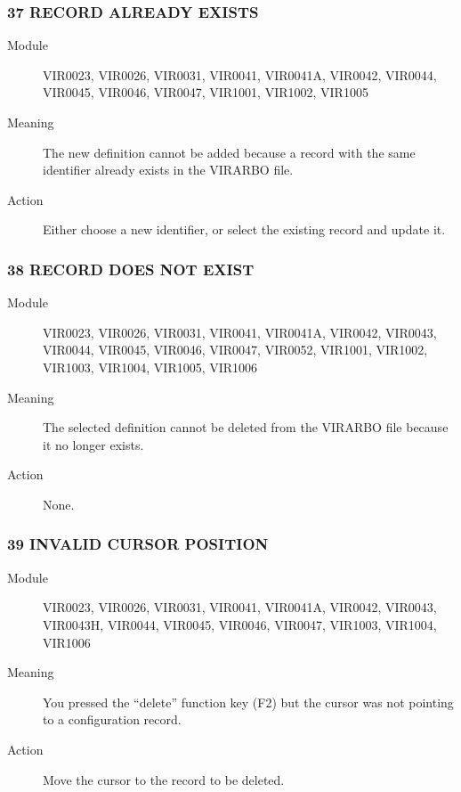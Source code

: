 \documentclass[letterpaper,10pt,english]{sphinxmanual}
\begin{document}
\subsubsection{37 RECORD ALREADY EXISTS}
\label{\detokenize{messages:record-already-exists}}\begin{description}
\item[{Module}] \leavevmode
VIR0023, VIR0026, VIR0031, VIR0041, VIR0041A, VIR0042, VIR0044, VIR0045, VIR0046, VIR0047, VIR1001, VIR1002, VIR1005

\item[{Meaning}] \leavevmode
The new definition cannot be added because a record with the same identifier already exists in the VIRARBO file.

\item[{Action}] \leavevmode
Either choose a new identifier, or select the existing record and update it.

\end{description}


\subsubsection{38 RECORD DOES NOT EXIST}
\label{\detokenize{messages:record-does-not-exist}}\begin{description}
\item[{Module}] \leavevmode
VIR0023, VIR0026, VIR0031, VIR0041, VIR0041A, VIR0042, VIR0043, VIR0044, VIR0045, VIR0046, VIR0047, VIR0052, VIR1001, VIR1002, VIR1003, VIR1004, VIR1005, VIR1006

\item[{Meaning}] \leavevmode
The selected definition cannot be deleted from the VIRARBO file because it no longer exists.

\item[{Action}] \leavevmode
None.

\end{description}


\subsubsection{39 INVALID CURSOR POSITION}
\label{\detokenize{messages:invalid-cursor-position}}\begin{description}
\item[{Module}] \leavevmode
VIR0023, VIR0026, VIR0031, VIR0041, VIR0041A, VIR0042, VIR0043, VIR0043H, VIR0044, VIR0045, VIR0046, VIR0047, VIR1003, VIR1004, VIR1006

\item[{Meaning}] \leavevmode
You pressed the “delete” function key (F2) but the cursor was not pointing to a configuration record.

\item[{Action}] \leavevmode
Move the cursor to the record to be deleted.

\end{description}
\end{document}

